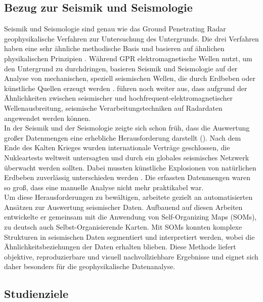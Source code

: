 \subsection{Bezug zur Seismik und Seismologie}

Seismik und Seismologie sind genau wie das Ground Penetrating Radar geophysikalische Verfahren zur Untersuchung des Untergrunds. Die drei Verfahren haben eine sehr ähnliche methodische Basis und basieren auf ähnlichen physikalischen Prinzipien \parencite{forte_review_2017}. Während GPR elektromagnetische Wellen nutzt, um den Untergrund zu durchdringen, basieren Seismik und Seismologie auf der Analyse von mechanischen, speziell seismischen Wellen, die durch Erdbeben oder künstliche Quellen erzeugt werden \parencite{carcione_acoustic-electromagnetic_1995}. \textcite{forte_review_2017} führen noch weiter aus, dass aufgrund der Ähnlichkeiten zwischen seismischer und hochfrequent-elektromagnetischer Wellenausbreitung, seismische Verarbeitungstechniken auf Radardaten angewendet werden können. \\
In der Seismik und der Seismologie zeigte sich schon früh, dass die Auswertung großer Datenmengen eine erhebliche Herausforderung darstellt (\cite{dowla_seismic_1990}). Nach dem Ende des Kalten Krieges wurden internationale Verträge geschlossen, die Nukleartests weltweit untersagten und durch ein globales seismisches Netzwerk überwacht werden sollten. Dabei mussten künstliche Explosionen von natürlichen Erdbeben zuverlässig unterschieden werden \parencite{dahlmann_monitoring_1977}. Die erfassten Datenmengen waren so groß, dass eine manuelle Analyse nicht mehr praktikabel war. \\
Um diese Herausforderungen zu bewältigen, arbeitete \textcite{dowla_seismic_1990} gezielt an automatisierten Ansätzen zur Auswertung seismischer Daten. Aufbauend auf diesen Arbeiten entwickelte er gemeinsam mit \textcite{maurer_seismic_1992} die Anwendung von Self-Organizing Maps (SOMs), zu deutsch auch Selbst-Organisierende Karten. Mit SOMs konnten komplexe Strukturen in seismischen Daten segmentiert und interpretiert werden, wobei die Ähnlichkeitsbeziehungen der Daten erhalten blieben. Diese Methode liefert objektive, reproduzierbare und visuell nachvollziehbare Ergebnisse und eignet sich daher besonders für die geophysikalische Datenanalyse.

\subsection{Studienziele}

